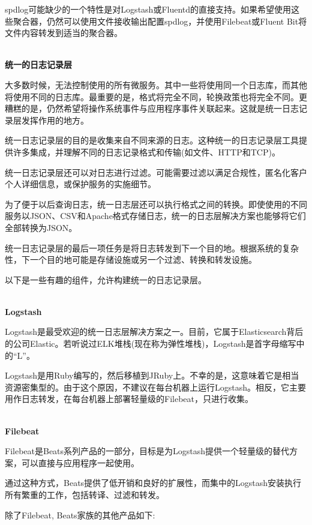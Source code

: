 spdlog可能缺少的一个特性是对Logstash或Fluentd的直接支持。如果希望使用这些聚合器，仍然可以使用文件接收输出配置spdlog，并使用Filebeat或Fluent Bit将文件内容转发到适当的聚合器。

\hspace*{\fill} \\ %
\noindent
\textbf{统一的日志记录层}

大多数时候，无法控制使用的所有微服务。其中一些将使用同一个日志库，而其他将使用不同的日志库。最重要的是，格式将完全不同，轮换政策也将完全不同。更糟糕的是，仍然希望将操作系统事件与应用程序事件关联起来。这就是统一日志记录层发挥作用的地方。

统一日志记录层的目的是收集来自不同来源的日志。这种统一的日志记录层工具提供许多集成，并理解不同的日志记录格式和传输(如文件、HTTP和TCP)。

统一日志记录层还可以对日志进行过滤。可能需要过滤以满足合规性，匿名化客户个人详细信息，或保护服务的实施细节。

为了便于以后查询日志，统一日志层还可以执行格式之间的转换。即使使用的不同服务以JSON、CSV和Apache格式存储日志，统一的日志层解决方案也能够将它们全部转换为JSON。

统一日志记录层的最后一项任务是将日志转发到下一个目的地。根据系统的复杂性，下一个目的地可能是存储设施或另一个过滤、转换和转发设施。

以下是一些有趣的组件，允许构建统一的日志记录层。

\hspace*{\fill} \\ %
\noindent
\textbf{Logstash}

Logstash是最受欢迎的统一日志层解决方案之一。目前，它属于Elasticsearch背后的公司Elastic。若听说过ELK堆栈(现在称为弹性堆栈)，Logstash是首字母缩写中的“L”。

Logstash是用Ruby编写的，然后移植到JRuby上。不幸的是，这意味着它是相当资源密集型的。由于这个原因，不建议在每台机器上运行Logstash。相反，它主要用作日志转发，在每台机器上部署轻量级的Filebeat，只进行收集。

\hspace*{\fill} \\ %
\noindent
\textbf{Filebeat}

Filebeat是Beats系列产品的一部分，目标是为Logstash提供一个轻量级的替代方案，可以直接与应用程序一起使用。

通过这种方式，Beats提供了低开销和良好的扩展性，而集中的Logstash安装执行所有繁重的工作，包括转译、过滤和转发。

除了Filebeat, Beats家族的其他产品如下:

